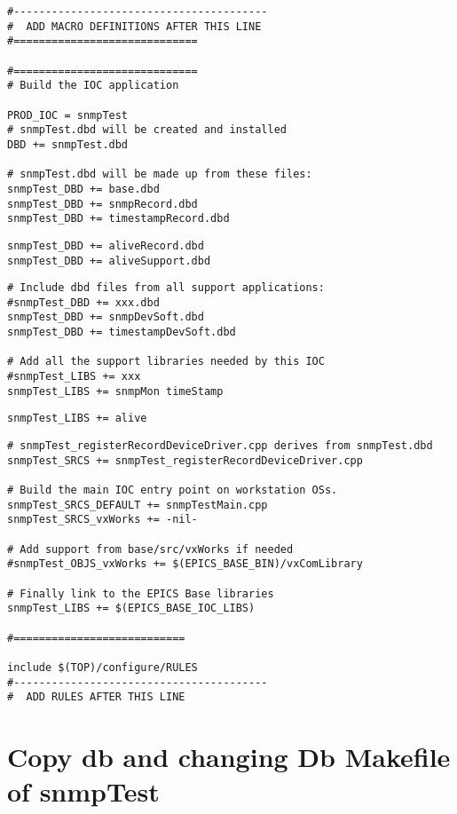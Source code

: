 \documentclass[11pt
  , a4paper
  , article
  , oneside
]{memoir}
\begin{document}
\begin{lstlisting}[style=termstyle]
#----------------------------------------
#  ADD MACRO DEFINITIONS AFTER THIS LINE
#=============================

#=============================
# Build the IOC application

PROD_IOC = snmpTest
# snmpTest.dbd will be created and installed
DBD += snmpTest.dbd

# snmpTest.dbd will be made up from these files:
snmpTest_DBD += base.dbd
snmpTest_DBD += snmpRecord.dbd
snmpTest_DBD += timestampRecord.dbd
\end{lstlisting}
\begin{lstlisting}[style=termstyle]
snmpTest_DBD += aliveRecord.dbd   
snmpTest_DBD += aliveSupport.dbd
\end{lstlisting}

\begin{lstlisting}[style=termstyle]
# Include dbd files from all support applications:
#snmpTest_DBD += xxx.dbd
snmpTest_DBD += snmpDevSoft.dbd
snmpTest_DBD += timestampDevSoft.dbd

# Add all the support libraries needed by this IOC
#snmpTest_LIBS += xxx
snmpTest_LIBS += snmpMon timeStamp
\end{lstlisting}
\begin{lstlisting}[style=termstyle]
snmpTest_LIBS += alive
\end{lstlisting}

\begin{lstlisting}[style=termstyle]
# snmpTest_registerRecordDeviceDriver.cpp derives from snmpTest.dbd
snmpTest_SRCS += snmpTest_registerRecordDeviceDriver.cpp

# Build the main IOC entry point on workstation OSs.
snmpTest_SRCS_DEFAULT += snmpTestMain.cpp
snmpTest_SRCS_vxWorks += -nil-

# Add support from base/src/vxWorks if needed
#snmpTest_OBJS_vxWorks += $(EPICS_BASE_BIN)/vxComLibrary

# Finally link to the EPICS Base libraries
snmpTest_LIBS += $(EPICS_BASE_IOC_LIBS)

#===========================

include $(TOP)/configure/RULES
#----------------------------------------
#  ADD RULES AFTER THIS LINE
\end{lstlisting}
\section{Copy db and changing Db Makefile of snmpTest}
\end{document}
